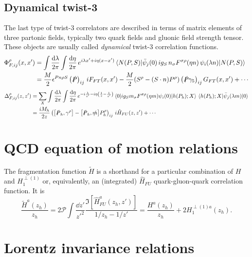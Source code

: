\subsection{Dynamical twist-3}
The last type of twist-3 correlators are described in terms of matrix elements of three partonic fields, typically two quark fields and gluonic field strength tensor. These objects are usually called \textit{dynamical} twist-3 correlation functions.
\begin{equation}
    \begin{aligned}
        \Phi^\rho_{F,ij}(x,x')&= \int\frac{\dd \lambda}{2\pi}\int\frac{\dd \eta}{2\pi} \,e^{i\lambda x'+i\eta(x-x')}\mel{N(P,S)}{\bar \psi_j(0)\,i g_S\, n_\sigma F^{\sigma \rho}(\eta n)\, \psi_i(\lambda n)}{N(P,S)}\\
        &= \frac{M}{2}\epsilon^{Pn\rho S}\left(\slashed{P }\right)_{ij}\,i F_{FT}(x,x')-\frac{M}{2}(S^\rho-(S \cdot n)P^\rho)\left(\slashed{P }\gamma_5\right)_{ij}G_{FT}(x,x')+\cdots
    \end{aligned}
\end{equation}
\begin{equation}
    \begin{aligned}
        \Delta^\rho_{F,ij}(z,z')&= \sum_X\int\frac{\dd \lambda}{2\pi}\int\frac{\dd \eta}{2\pi} \,e^{-i\frac{\lambda}{z'}-i\eta\left(\frac{1}{z}-\frac{1}{z'}\right)}\mel{0}{ig_S m_\sigma F^{\sigma \rho}(\eta m)\psi_i(0)}{h(P_h);X}\mel{h(P_h);X}{\bar \psi_j(\lambda m)}{0}\\
        &= \frac{iM_h}{2z}\left(\comm{\slashed{P}_h}{\gamma^\rho}-\comm{\slashed{P}_h}{\slashed{m}}P_h^\rho\right)_{ij}\,i\hat H_{FU}(z,z')+\cdots
        \end{aligned}
\end{equation}
\section{QCD equation of motion relations}
The fragmentation function $\tilde H$ is a shorthand for a particular combination of $H$ and $H_1^{\perp(1)}$ or, equivalently, an (integrated) $\hat H_{FU}$ quark-gluon-quark correlation function. It is 
\begin{equation}\label{eq:Htildedefinition}
    \frac{\tilde{H}^a(z_h)}{z_h}=2\mathcal{P}\int\frac{\dd z'}{z'^2}\frac{\Im[\hat H^a_{FU}(z_h,z')]}{1/z_h-1/z'}=\frac{H^a(z_h)}{z_h}+2H_1^{\perp(1)a}(z_h).
\end{equation}
\section{Lorentz invariance relations}
